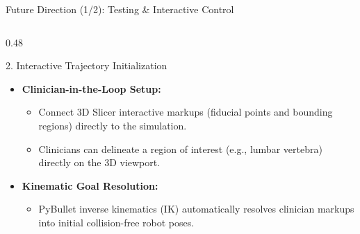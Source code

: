 \documentclass{if-beamer}
\begin{document}
\begin{frame}{Future Direction (1/2): Testing \& Interactive Control}
\begin{columns}[T]
        \begin{column}{0.48\textwidth}
            \begin{block}{2. Interactive Trajectory Initialization}
                \begin{itemize}\itemsep=3pt
                    \item \textbf{Clinician-in-the-Loop Setup:}
                    \begin{itemize}\itemsep=1pt
                        \item Connect 3D Slicer interactive markups (fiducial points and bounding regions) directly to the simulation.
                        \item Clinicians can delineate a region of interest (e.g., lumbar vertebra) directly on the 3D viewport.
                    \end{itemize}
                    \item \textbf{Kinematic Goal Resolution:}
                    \begin{itemize}\itemsep=1pt
                        \item PyBullet inverse kinematics (IK) automatically resolves clinician markups into initial collision-free robot poses.
                    \end{itemize}
                \end{itemize}
            \end{block}
        \end{column}
    \end{columns}
\end{frame}
\end{document}
